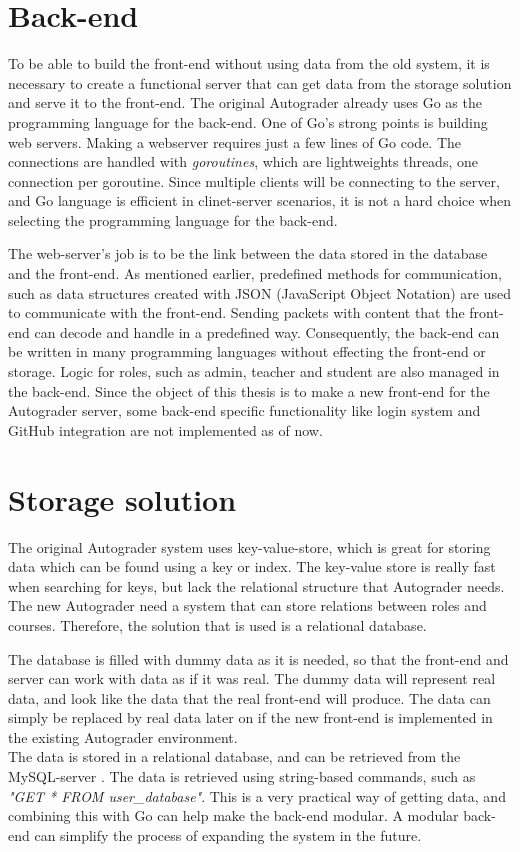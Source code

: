 \section{Back-end}
To be able to build the front-end without using data from the old system, it is necessary to create a functional server that can get data from the storage solution and serve it to the front-end. The original Autograder already uses Go as the programming language for the back-end. One of Go's strong points is building web servers. Making a webserver requires just a few lines of Go code. The connections are handled with \emph{goroutines}, which are lightweights threads, one connection per goroutine. Since multiple clients will be connecting to the server, and Go language is efficient in clinet-server scenarios, it is not a hard choice when selecting the programming language for the back-end. 

The web-server's job is to be the link between the data stored in the database and the front-end. As mentioned earlier, predefined methods for communication, such as data structures created with JSON (JavaScript Object Notation) are used to communicate with the front-end. Sending packets with content that the front-end can decode and handle in a predefined way. Consequently, the back-end can be written in many programming languages without effecting the front-end or storage. Logic for roles, such as admin, teacher and student are also managed in the back-end. Since the object of this thesis is to make a new front-end for the Autograder server, some back-end specific functionality like login system and GitHub integration are not implemented as of now.

\section{Storage solution}
The original Autograder system uses key-value-store, which is great for storing data which can be found using a key or index. The key-value store is really fast when searching for keys, but lack the relational structure that Autograder needs. The new Autograder need a system that can store relations between roles and courses. Therefore, the solution that is used is a relational database. 

The database is filled with dummy data as it is needed, so that the front-end and server can work with data as if it was real. The dummy data will represent real data, and look like the data that the real front-end will produce. The data can simply be replaced by real data later on if the new front-end is implemented in the existing Autograder environment.
\\The data is stored in a relational database, and can be retrieved from the MySQL-server \cite{mysqlserver}. The data is retrieved using string-based commands, such as \emph{"GET * FROM user\_database"}. This is a very practical way of getting data, and combining this with Go can help make the back-end modular. A modular back-end can simplify the process of expanding the system in the future.

